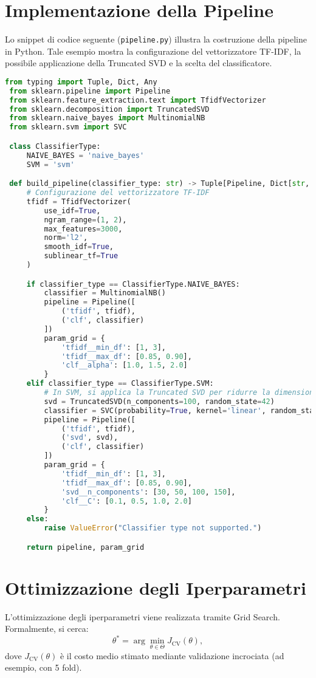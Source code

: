  \section{Implementazione della Pipeline}
 Lo snippet di codice seguente (\texttt{pipeline.py}) illustra la costruzione della pipeline in Python. Tale esempio mostra la configurazione del vettorizzatore TF-IDF, la possibile applicazione della Truncated SVD e la scelta del classificatore.

 \begin{lstlisting}[language=Python,caption={File pipeline.py}]
 from typing import Tuple, Dict, Any
 from sklearn.pipeline import Pipeline
 from sklearn.feature_extraction.text import TfidfVectorizer
 from sklearn.decomposition import TruncatedSVD
 from sklearn.naive_bayes import MultinomialNB
 from sklearn.svm import SVC

 class ClassifierType:
     NAIVE_BAYES = 'naive_bayes'
     SVM = 'svm'

 def build_pipeline(classifier_type: str) -> Tuple[Pipeline, Dict[str, Any]]:
     # Configurazione del vettorizzatore TF-IDF
     tfidf = TfidfVectorizer(
         use_idf=True,
         ngram_range=(1, 2),
         max_features=3000,
         norm='l2',
         smooth_idf=True,
         sublinear_tf=True
     )

     if classifier_type == ClassifierType.NAIVE_BAYES:
         classifier = MultinomialNB()
         pipeline = Pipeline([
             ('tfidf', tfidf),
             ('clf', classifier)
         ])
         param_grid = {
             'tfidf__min_df': [1, 3],
             'tfidf__max_df': [0.85, 0.90],
             'clf__alpha': [1.0, 1.5, 2.0]
         }
     elif classifier_type == ClassifierType.SVM:
         # In SVM, si applica la Truncated SVD per ridurre la dimensionalita
         svd = TruncatedSVD(n_components=100, random_state=42)
         classifier = SVC(probability=True, kernel='linear', random_state=42)
         pipeline = Pipeline([
             ('tfidf', tfidf),
             ('svd', svd),
             ('clf', classifier)
         ])
         param_grid = {
             'tfidf__min_df': [1, 3],
             'tfidf__max_df': [0.85, 0.90],
             'svd__n_components': [30, 50, 100, 150],
             'clf__C': [0.1, 0.5, 1.0, 2.0]
         }
     else:
         raise ValueError("Classifier type not supported.")

     return pipeline, param_grid
 \end{lstlisting}

 \section{Ottimizzazione degli Iperparametri}
 L'ottimizzazione degli iperparametri viene realizzata tramite Grid Search. Formalmente, si cerca:
 \[
 \theta^* = \arg \min_{\theta \in \Theta} J_{\text{CV}}(\theta),
 \]
 dove \(J_{\text{CV}}(\theta)\) è il costo medio stimato mediante validazione incrociata (ad esempio, con 5 fold).

